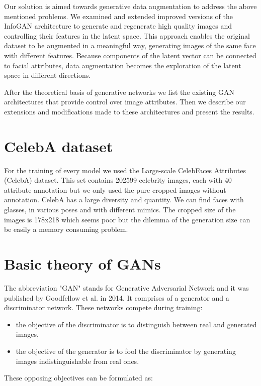 \documentclass{egpubl}
\begin{document}
Our solution is aimed towards generative data augmentation to address the above mentioned problems. We examined and extended improved versions of the InfoGAN architecture to generate and regenerate high quality images and controlling their features in the latent space. This approach enables the original dataset to be augmented in a meaningful way, generating images of the same face with different features. Because components of the latent vector can be connected to facial attributes, data augmentation becomes the exploration of the latent space in different directions.

After the theoretical basis of generative networks we list the existing GAN architectures that provide control over image attributes. Then we describe our extensions and modifications made to these architectures and present the results.


\section{CelebA dataset}

For the training of every model we used the Large-scale CelebFaces Attributes (CelebA) dataset. This set contains 202599 celebrity images, each with 40 attribute annotation but we only used the pure cropped images without annotation. CelebA has a large diversity and quantity. We can find faces with glasses, in various poses and with different mimics. The cropped size of the images is 178x218 which seems poor but the dilemma of the generation size can be easily a memory consuming problem.


\section{Basic theory of GANs}
The abbreviation "GAN" stands for Generative Adversarial Network and it was published by Goodfellow et al. \cite{goodfellow2014generative} in 2014. It comprises of a generator and a discriminator network. These networks compete during training:

\begin{itemize}
	\item the objective of the discriminator is to distinguish between real and generated images,
	\item the objective of the generator is to fool the discriminator by generating images indistinguishable from real ones. 
\end{itemize}

These opposing objectives can be formulated as:
\end{document}

